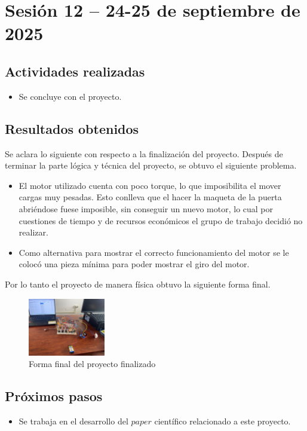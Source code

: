 \documentclass[12pt,letterpaper]{article}
\begin{document}
\section{Sesión 12 -- 24-25 de septiembre de 2025}
\subsection*{Actividades realizadas}
\begin{itemize}
    \item Se concluye con el proyecto.
\end{itemize}

\subsection*{Resultados obtenidos}
Se aclara lo siguiente con respecto a la finalización del proyecto. Después de terminar la parte lógica y técnica del proyecto, se obtuvo el siguiente problema. 
\begin{itemize}
    \item El motor utilizado cuenta con poco torque, lo que imposibilita el mover cargas muy pesadas. Esto conlleva que el hacer la maqueta de la puerta abriéndose fuese imposible, sin conseguir un nuevo motor, lo cual por cuestiones de tiempo y de recursos económicos el grupo de trabajo decidió no realizar.
    \item Como alternativa para mostrar el correcto funcionamiento del motor se le colocó una pieza mínima para poder mostrar el giro del motor.
\end{itemize}
Por lo tanto el proyecto de manera física obtuvo la siguiente forma final.
\begin{figure}[H]
    \centering
    \includegraphics[width=0.3\textwidth]{images/final_pp.jpg} %
    \caption{Forma final del proyecto finalizado}
    \label{fig:CONCLU}
\end{figure}

\subsection*{Próximos pasos}
\begin{itemize}
    \item Se trabaja en el desarrollo del $paper$ científico relacionado a este proyecto.
\end{itemize}
\end{document}

